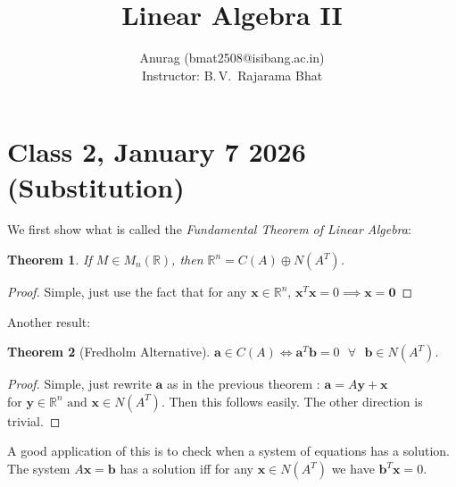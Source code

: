\documentclass{article}
\title{Linear Algebra II}
\author{
\begin{tabular}{c}
Anurag (bmat2508@isibang.ac.in)\\[0.6em]
Instructor: B.\,V.\ Rajarama Bhat
\end{tabular}
}
\date{}
\newtheorem{theorem}{Theorem}
\begin{document}
\maketitle
\section*{Class 2, January 7 2026 (Substitution)}  
We first show what is called the \textit{Fundamental Theorem of Linear Algebra}:\\
\begin{theorem}
If $M\in M_n(\mathbb{R})$, then $\mathbb{R}^n=C(A)\oplus N(A^{T})$.
\end{theorem}
\begin{proof}
Simple, just use the fact that for any $\mathbf{x}\in \mathbb{R}^n$, $\mathbf{x}^{T}\mathbf{x}=0 \implies \mathbf{x}=\mathbf{0}$
\end{proof}
Another result:
\begin{theorem}[Fredholm Alternative] 
    $\mathbf{a}\in C(A) \iff \mathbf{a}^{T}\mathbf{b}=0 \text{ }\forall \text{ }\mathbf{b} \in N(A^{T})$.
\end{theorem}
\begin{proof}
Simple, just rewrite $\mathbf{a}$ as in the previous theorem : $\mathbf{a}=A\mathbf{y}+\mathbf{x}$ 
\\for $\mathbf{y}\in \mathbb{R}^{n} 
\text{ and } \mathbf{x}\in N(A^{T})$. Then this follows easily.
The other direction is trivial.
\end{proof}
A good application of this is to check when a system of equations has a solution. 
The system $A\mathbf{x}=\mathbf{b}$ has a solution iff for any $\mathbf{x}\in N(A^{T})$ we have $\mathbf{b}^{T}\mathbf{x}=0$.  
\end{document}
